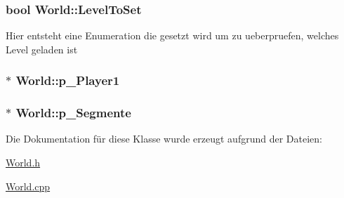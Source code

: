\hypertarget{class_world_a11f6309cf175e5c89c54c1408067bf06}{
\subsubsection[{Level\-To\-Set}]{\setlength{\rightskip}{0pt plus 5cm}bool World\-::\-Level\-To\-Set\hspace{0.3cm}{\ttfamily [private]}}}\label{class_world_a11f6309cf175e5c89c54c1408067bf06}
Hier entsteht eine Enumeration die gesetzt wird um zu ueberpruefen, welches Level geladen ist \hypertarget{class_world_ab37dcbf81f1120451fb908ec2dfbb816}{
\subsubsection[{p\-\_\-\-Player1}]{$\ast$ World\-::p\-\_\-\-Player1\hspace{0.3cm}{\ttfamily [private]}}}\label{class_world_ab37dcbf81f1120451fb908ec2dfbb816}
\hypertarget{class_world_a277b8c9ea049b36eff31b0e9b9324295}{
\subsubsection[{p\-\_\-\-Segmente}]{$\ast$ World\-::p\-\_\-\-Segmente\hspace{0.3cm}{\ttfamily [private]}}}\label{class_world_a277b8c9ea049b36eff31b0e9b9324295}


Die Dokumentation für diese Klasse wurde erzeugt aufgrund der Dateien\-:\begin{DoxyCompactItemize}
\item 
\hyperlink{_world_8h}{World.\-h}\item 
\hyperlink{_world_8cpp}{World.\-cpp}\end{DoxyCompactItemize}
